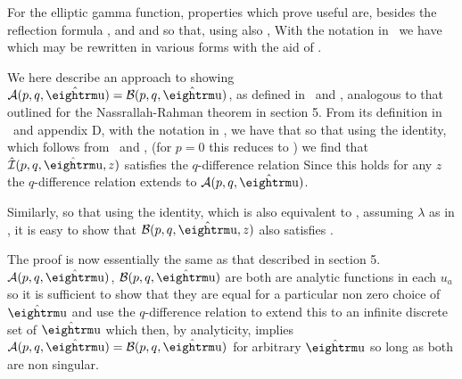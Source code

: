 For the elliptic gamma function,
properties which prove useful are, besides the reflection formula \GG,
\eqn{}
and 
\eqn{}
and
\eqn{}
so that, using also \fgtr,
\eqn{}
With the notation in \mGam\ we have
\eqn{}
which may be rewritten in various forms with the aid of \thid.




We here describe an approach to showing  $\A(p,q,\hu)=\B(p,q,\hu)$, as defined
in \IA\ and  \indexm, analogous to that outlined for
the Nassrallah-Rahman theorem in section 5. From its definition in
\ and appendix D, with the notation in \eprod, we have that
\eqn{}
so that using the identity, which follows from \addth\ and \thid,
\eqn{}
(for $p=0$ this reduces to \fourtid)
we find that $\hI(p,q,\hu,z)$ satisfies the $q$-difference relation
\eqn{}
Since this holds for any $z$ the $q$-difference relation extends to $\A(p,q,\hu)$.

Similarly,
\eqn{}
so that using the  identity, which is also equivalent to \addth,
\eqn{}
assuming $\lambda$ as in ,
it is easy to show that $\B(p,q,\hu,z)$ also satisfies \qdifft.

The proof is now essentially the same as that described in section 5. 
$\A(p,q,\hu)$, $\B(p,q,\hu)$ are both are analytic functions in each $u_a$ so it is
sufficient to show that they are equal for a particular non zero choice of $\hu$
and use the $q$-difference relation to extend this to an infinite discrete set of
$\hu$ which then, by analyticity, implies $\A(p,q,\hu) =\B(p,q,\hu)$ for arbitrary 
$\hu$  so long as both are non singular. 
 

